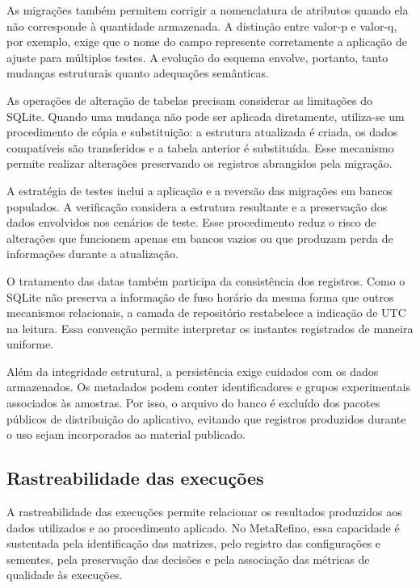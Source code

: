 As migrações também permitem corrigir a nomenclatura de atributos quando ela não corresponde à quantidade armazenada. A distinção entre valor-p e valor-q, por exemplo, exige que o nome do campo represente corretamente a aplicação de ajuste para múltiplos testes. A evolução do esquema envolve, portanto, tanto mudanças estruturais quanto adequações semânticas.

As operações de alteração de tabelas precisam considerar as limitações do SQLite. Quando uma mudança não pode ser aplicada diretamente, utiliza-se um procedimento de cópia e substituição: a estrutura atualizada é criada, os dados compatíveis são transferidos e a tabela anterior é substituída. Esse mecanismo permite realizar alterações preservando os registros abrangidos pela migração.

A estratégia de testes inclui a aplicação e a reversão das migrações em bancos populados. A verificação considera a estrutura resultante e a preservação dos dados envolvidos nos cenários de teste. Esse procedimento reduz o risco de alterações que funcionem apenas em bancos vazios ou que produzam perda de informações durante a atualização.

O tratamento das datas também participa da consistência dos registros. Como o SQLite não preserva a informação de fuso horário da mesma forma que outros mecanismos relacionais, a camada de repositório restabelece a indicação de UTC na leitura. Essa convenção permite interpretar os instantes registrados de maneira uniforme.

Além da integridade estrutural, a persistência exige cuidados com os dados armazenados. Os metadados podem conter identificadores e grupos experimentais associados às amostras. Por isso, o arquivo do banco é excluído dos pacotes públicos de distribuição do aplicativo, evitando que registros produzidos durante o uso sejam incorporados ao material publicado.

\subsection{Rastreabilidade das execuções}
\label{subsec:rastreabilidade-execucoes}

A rastreabilidade das execuções permite relacionar os resultados produzidos aos dados utilizados e ao procedimento aplicado. No MetaRefino, essa capacidade é sustentada pela identificação das matrizes, pelo registro das configurações e sementes, pela preservação das decisões e pela associação das métricas de qualidade às execuções.

